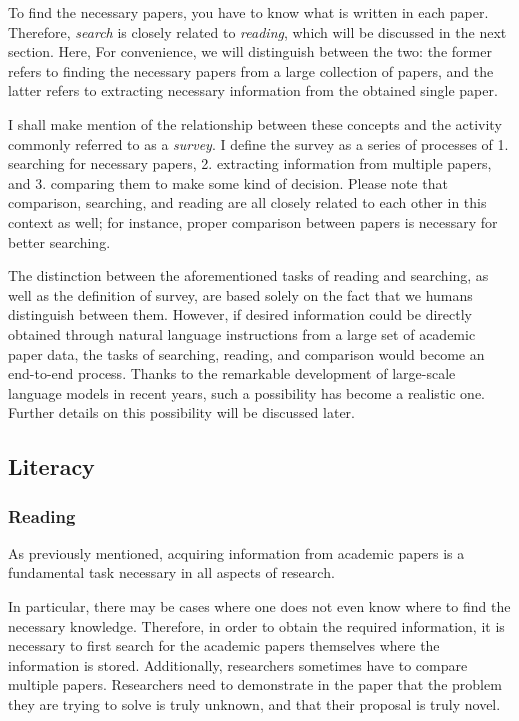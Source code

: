 \documentclass{book}
\begin{document}
To find the necessary papers, you have to know what is written in each paper. Therefore, \textit{search} is closely related to \textit{reading}, which will be discussed in the next section. Here, For convenience, we will distinguish between the two: the former refers to finding the necessary papers from a large collection of papers, and the latter refers to extracting necessary information from the obtained single paper.

I shall make mention of the relationship between these concepts and the activity commonly referred to as a \textit{survey}. I define the survey as a series of processes of 1. searching for necessary papers, 2. extracting information from multiple papers, and 3. comparing them to make some kind of decision. Please note that comparison, searching, and reading are all closely related to each other in this context as well; for instance, proper comparison between papers is necessary for better searching.

The distinction between the aforementioned tasks of reading and searching, as well as the definition of survey, are based solely on the fact that we humans distinguish between them. However, if desired information could be directly obtained through natural language instructions from a large set of academic paper data, the tasks of searching, reading, and comparison would become an end-to-end process. Thanks to the remarkable development of large-scale language models in recent years, such a possibility has become a realistic one. Further details on this possibility will be discussed later.

\subsection{Literacy}
\subsubsection{Reading}
As previously mentioned, acquiring information from academic papers is a fundamental task necessary in all aspects of research.

In particular, there may be cases where one does not even know where to find the necessary knowledge. Therefore, in order to obtain the required information, it is necessary to first search for the academic papers themselves where the information is stored. 
Additionally, researchers sometimes have to compare multiple papers. Researchers need to demonstrate in the paper that the problem they are trying to solve is truly unknown, and that their proposal is truly novel.
\end{document}
